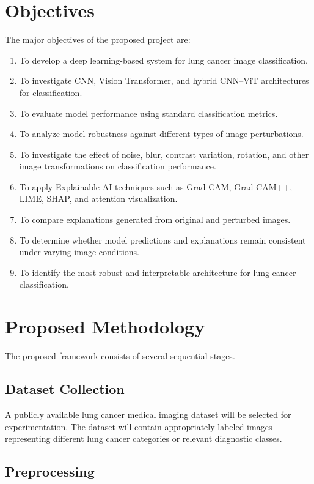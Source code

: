 \documentclass[12pt,a4paper]{article}
\begin{document}
\section{Objectives}

The major objectives of the proposed project are:

\begin{enumerate}
    \item To develop a deep learning-based system for lung cancer image classification.
    \item To investigate CNN, Vision Transformer, and hybrid CNN--ViT architectures for classification.
    \item To evaluate model performance using standard classification metrics.
    \item To analyze model robustness against different types of image perturbations.
    \item To investigate the effect of noise, blur, contrast variation, rotation, and other image transformations on classification performance.
    \item To apply Explainable AI techniques such as Grad-CAM, Grad-CAM++, LIME, SHAP, and attention visualization.
    \item To compare explanations generated from original and perturbed images.
    \item To determine whether model predictions and explanations remain consistent under varying image conditions.
    \item To identify the most robust and interpretable architecture for lung cancer classification.
\end{enumerate}

\section{Proposed Methodology}

The proposed framework consists of several sequential stages.

\subsection{Dataset Collection}

A publicly available lung cancer medical imaging dataset will be selected for experimentation. The dataset will contain appropriately labeled images representing different lung cancer categories or relevant diagnostic classes.

\subsection{Preprocessing}
\end{document}
